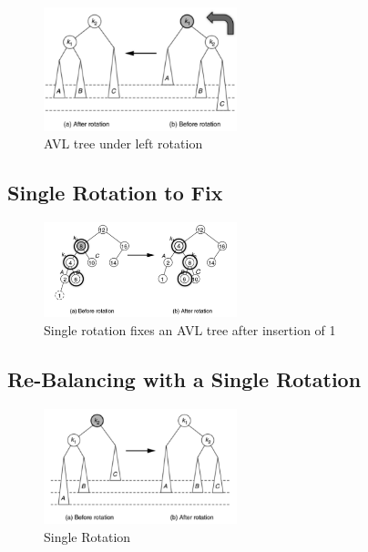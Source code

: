 \documentclass[
  10pt,
  english,
  letterpaper,
,tablecaptionabove
]{scrartcl}
\begin{document}
\begin{figure}
\centering
\includegraphics[width=0.5\textwidth,height=\textheight]{images/4.png}
\caption{AVL tree under left rotation}
\end{figure}

\hypertarget{single-rotation-to-fix}{%
\subsection{Single Rotation to Fix}\label{single-rotation-to-fix}}

\begin{figure}
\centering
\includegraphics[width=0.5\textwidth,height=\textheight]{images/5.png}
\caption{Single rotation fixes an AVL tree after insertion of 1}
\end{figure}

\hypertarget{re-balancing-with-a-single-rotation}{%
\subsection{Re-Balancing with a Single
Rotation}\label{re-balancing-with-a-single-rotation}}

\begin{figure}
\centering
\includegraphics[width=0.5\textwidth,height=\textheight]{images/6.png}
\caption{Single Rotation}
\end{figure}
\end{document}
